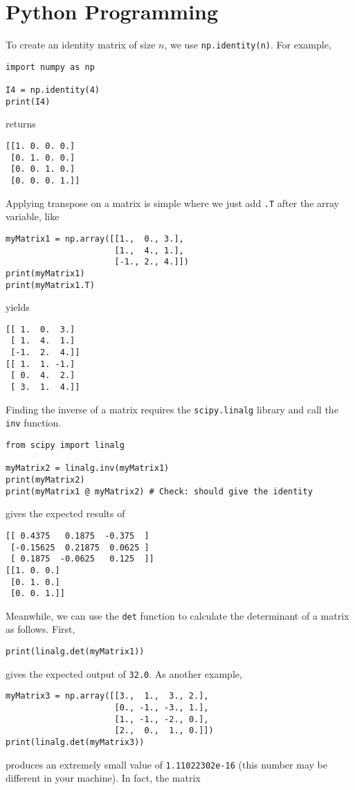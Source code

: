 \section{Python Programming}
\label{section:ch2python}
To create an identity matrix of size $n$, we use \verb|np.identity(n)|. For example,
\begin{lstlisting}
import numpy as np

I4 = np.identity(4)
print(I4)
\end{lstlisting}
returns
\begin{lstlisting}
[[1. 0. 0. 0.]
 [0. 1. 0. 0.]
 [0. 0. 1. 0.]
 [0. 0. 0. 1.]]
\end{lstlisting}
Applying transpose on a matrix is simple where we just add \verb|.T| after the array variable, like
\begin{lstlisting}
myMatrix1 = np.array([[1.,  0., 3.],
                      [1.,  4., 1.],
                      [-1., 2., 4.]])
print(myMatrix1)
print(myMatrix1.T)
\end{lstlisting}
yields
\begin{lstlisting}
[[ 1.  0.  3.]
 [ 1.  4.  1.]
 [-1.  2.  4.]]
[[ 1.  1. -1.]
 [ 0.  4.  2.]
 [ 3.  1.  4.]]
\end{lstlisting}
Finding the inverse of a matrix requires the \verb|scipy.linalg| library and call the \verb|inv| function.
\begin{lstlisting}
from scipy import linalg

myMatrix2 = linalg.inv(myMatrix1)
print(myMatrix2)
print(myMatrix1 @ myMatrix2) # Check: should give the identity
\end{lstlisting}
gives the expected results of
\begin{lstlisting}
[[ 0.4375   0.1875  -0.375  ]
 [-0.15625  0.21875  0.0625 ]
 [ 0.1875  -0.0625   0.125  ]]
[[1. 0. 0.]
 [0. 1. 0.]
 [0. 0. 1.]]
\end{lstlisting}
Meanwhile, we can use the \verb|det| function to calculate the determinant of a matrix as follows. First,
\begin{lstlisting}
print(linalg.det(myMatrix1))
\end{lstlisting}
gives the expected output of \verb|32.0|. As another example,
\begin{lstlisting}
myMatrix3 = np.array([[3.,  1.,  3., 2.],
                      [0., -1., -3., 1.],
                      [1., -1., -2., 0.],
                      [2.,  0.,  1., 0.]])
print(linalg.det(myMatrix3))
\end{lstlisting}
produces an extremely small value of \verb|1.11022302e-16| (this number may be different in your machine). In fact, the matrix
